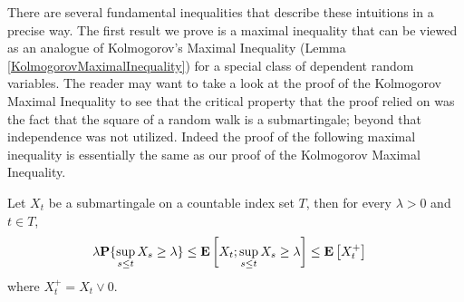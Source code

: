 There are several fundamental inequalities that describe
these intuitions in a precise way.  The first result we prove is a maximal
inequality that can be viewed as an analogue of Kolmogorov's Maximal
Inequality (Lemma \ref{KolmogorovMaximalInequality}) for a special
class of dependent random variables.  The reader may want to take a look at the proof of the Kolmogorov Maximal Inequality
to see that the critical property that the proof relied on was the fact that the square of a random walk is a submartingale; beyond that
independence was not utilized.  Indeed the
proof of the following maximal inequality is essentially the same as our proof of the Kolmogorov Maximal Inequality.
\begin{lem}\label{DoobMaximalInequalityDiscrete}Let $X_t$ be a
  submartingale on a countable index set $T$, then for every $\lambda
  > 0$ and $t \in T$,
\begin{align*}
\lambda \textbf{P}\{\sup_{s \leq t} X_s \geq \lambda\} &\leq
\textbf{E}\left[X_t ; \sup_{s \leq t} X_s  \geq \lambda\right] \leq \textbf{E}\left[X_t^+\right]
\end{align*}
where $X_t^+ = X_t \vee 0$.
\end{lem}

